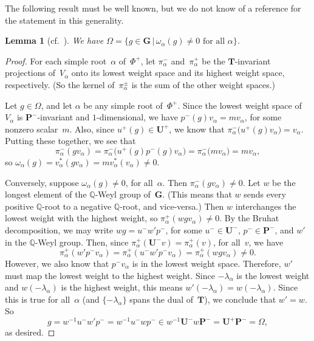 \documentclass[pdftex]{sigma}
\newcommand{\QQ}{\mathbb{Q}}
\newcommand{\Ga}{\mathbf{G}}
\newcommand{\Pa}{\mathbf{P}}
\newcommand{\Ta}{\mathbf{T}}
\newcommand{\Ua}{\mathbf{U}}
\numberwithin{equation}{section}
\newtheorem{lem}[thm]{Lemma}
\theoremstyle{definition}
\begin{document}
The following result must be well known, but we do not know of a reference for the statement in this generality.

\begin{lem}[cf.\ {\cite[Lemma~4.11(i)]{MR1828742}}] \label{OmegaIdeal}
We have $\Omega = \{ g \in \Ga \,|\, \text{$\omega_\alpha(g) \neq 0$ for all~$\alpha$} \} $.
\end{lem}

\begin{proof}
For each simple root~$\alpha$ of~$\Phi^+$, let $\pi^-_\alpha$ and~$\pi^+_\alpha$ be the $\Ta$-invariant projections of~$V_\alpha$ onto its lowest weight space and its highest weight space, respectively. (So the kernel of~$\pi^\pm_\alpha$ is the sum of the other weight spaces.)

Let $g \in \Omega$, and let $\alpha$ be any simple root of~$\Phi^+$. Since the lowest weight space of~$V_\alpha$ is $\Pa^-$-invariant and $1$-dimensional, we have $p^-(g) v_\alpha = m v_\alpha$, for some nonzero scalar~$m$. Also, since $u^+(g) \in \Ua^+$, we know that $\pi^-_\alpha \bigl( u^+(g) v_\alpha \bigr) = v_\alpha$. Putting these together, we see that
	\[ \pi^-_\alpha(gv_\alpha)
	= \pi^-_\alpha \bigl( u^+(g) p^-(g) v_\alpha \bigr)
	= \pi^-_\alpha \bigl( m v_\alpha \bigr)
	= m v_\alpha, \]
so $\omega_\alpha(g) = v_\alpha^*( g v_\alpha) = m v_\alpha^*( v_\alpha) \neq 0$.

Conversely, suppose $\omega_\alpha(g) \neq 0$, for all~$\alpha$.
Then $\pi^-_\alpha(g v_\alpha) \neq 0$.
Let $w$ be the longest element of the $\QQ$-Weyl group of~$\Ga$. (This means that $w$ sends every positive $\QQ$-root to a negative $\QQ$-root, and vice-versa.)
Then $w$ interchanges the lowest weight with the highest weight, so $\pi^+_\alpha(w g v_\alpha) \neq 0$.
By the Bruhat decomposition, we may write $w g = u^- w' p^-$, for some $u^- \in \Ua^-$, $p^- \in \Pa^-$, and $w'$ in the $\QQ$-Weyl group.
Then, since $\pi^+_\alpha(\Ua^- v) = \pi^+_\alpha(v)$, for all~$v$, we have
\[ \pi^+_\alpha(w' p^- v_\alpha)= \pi^+_\alpha(u^- w' p^- v_\alpha)= \pi^+_\alpha(w g v_\alpha)	\neq 0.
\]
However, we also know that $p^- v_\alpha$ is in the lowest weight space. Therefore, $w'$ must map the lowest weight to the highest weight. Since $-\lambda_\alpha$ is the lowest weight and $w(-\lambda_\alpha)$ is the highest weight, this means $w'(-\lambda_\alpha) = w(-\lambda_\alpha)$. Since this is true for all~$\alpha$ (and $\{-\lambda_\alpha\}$ spans the dual of~$\Ta$), we conclude that $w' = w$. So
	\[ g
	= w^{-1} u^- w' p^-
	= w^{-1} u^- w p^-
	\in w^{-1} \Ua^- w \Pa^-
	= \Ua^+ \Pa^-
	= \Omega
	, \]
as desired.
\end{proof}
\end{document}
